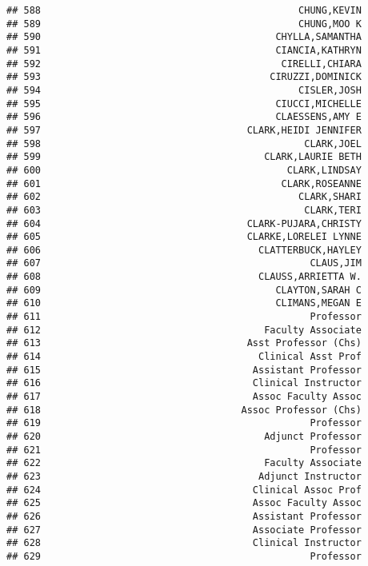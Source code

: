 \documentclass[
]{article}
\begin{document}
\begin{verbatim}
## 588                                             CHUNG,KEVIN
## 589                                             CHUNG,MOO K
## 590                                         CHYLLA,SAMANTHA
## 591                                         CIANCIA,KATHRYN
## 592                                          CIRELLI,CHIARA
## 593                                        CIRUZZI,DOMINICK
## 594                                             CISLER,JOSH
## 595                                         CIUCCI,MICHELLE
## 596                                         CLAESSENS,AMY E
## 597                                    CLARK,HEIDI JENNIFER
## 598                                              CLARK,JOEL
## 599                                       CLARK,LAURIE BETH
## 600                                           CLARK,LINDSAY
## 601                                          CLARK,ROSEANNE
## 602                                             CLARK,SHARI
## 603                                              CLARK,TERI
## 604                                    CLARK-PUJARA,CHRISTY
## 605                                    CLARKE,LORELEI LYNNE
## 606                                      CLATTERBUCK,HAYLEY
## 607                                               CLAUS,JIM
## 608                                      CLAUSS,ARRIETTA W.
## 609                                         CLAYTON,SARAH C
## 610                                         CLIMANS,MEGAN E
## 611                                               Professor
## 612                                       Faculty Associate
## 613                                    Asst Professor (Chs)
## 614                                      Clinical Asst Prof
## 615                                     Assistant Professor
## 616                                     Clinical Instructor
## 617                                     Assoc Faculty Assoc
## 618                                   Assoc Professor (Chs)
## 619                                               Professor
## 620                                       Adjunct Professor
## 621                                               Professor
## 622                                       Faculty Associate
## 623                                      Adjunct Instructor
## 624                                     Clinical Assoc Prof
## 625                                     Assoc Faculty Assoc
## 626                                     Assistant Professor
## 627                                     Associate Professor
## 628                                     Clinical Instructor
## 629                                               Professor

\end{verbatim}
\end{document}
